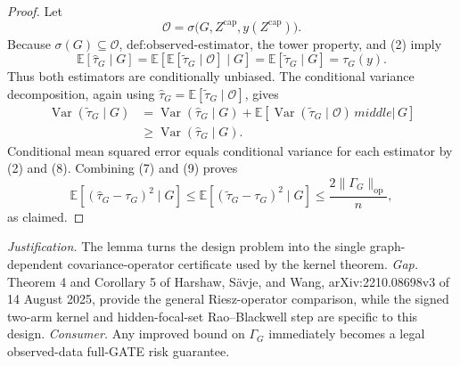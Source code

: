 \documentclass{article}
\begin{document}
\begin{proof}
Let
\[
 \mathscr O=\sigma\bigl(G,Z^{\mathrm{cap}},y(Z^{\mathrm{cap}})\bigr).
\]
Because \(\sigma(G)\subseteq\mathscr O\), \(\text{def:observed-estimator}\), the tower property, and (2) imply
\[
 \mathbb E[\widehat\tau_G\mid G]
 =\mathbb E\!\left[\mathbb E[\widetilde\tau_G\mid\mathscr O]\mid G\right]
 =\mathbb E[\widetilde\tau_G\mid G]
 =\tau_G(y). \tag{8}
\]
Thus both estimators are conditionally unbiased.  The conditional variance decomposition, again using \(\widehat\tau_G=\mathbb E[\widetilde\tau_G\mid\mathscr O]\), gives
\[
\begin{aligned}
 \operatorname{Var}(\widetilde\tau_G\mid G)
 &=\operatorname{Var}(\widehat\tau_G\mid G)
   +\mathbb E\!\left[
      \operatorname{Var}(\widetilde\tau_G\mid\mathscr O)
      \,middle|\,G\right]\\
 &\ge \operatorname{Var}(\widehat\tau_G\mid G). \tag{9}
\end{aligned}
\]
Conditional mean squared error equals conditional variance for each estimator by (2) and (8).  Combining (7) and (9) proves
\[
 \mathbb E[(\widehat\tau_G-\tau_G)^2\mid G]
 \le \mathbb E[(\widetilde\tau_G-\tau_G)^2\mid G]
 \le \frac{2\lVert\Gamma_G\rVert_{\mathrm{op}}}{n},
\]
as claimed.
\end{proof}
\par\smallskip\noindent \textit{Justification.} The lemma turns the design problem into the single graph-dependent covariance-operator certificate used by the kernel theorem. \textit{Gap.} Theorem 4 and Corollary 5 of Harshaw, S\"avje, and Wang, arXiv:2210.08698v3 of 14 August 2025, provide the general Riesz-operator comparison, while the signed two-arm kernel and hidden-focal-set Rao--Blackwell step are specific to this design. \textit{Consumer.} Any improved bound on \(\Gamma_G\) immediately becomes a legal observed-data full-GATE risk guarantee.
\end{document}
